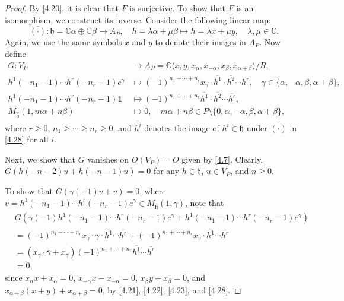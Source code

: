 \documentclass[12pt,a4paper,reqno]{amsart}
\numberwithin{equation}{section}
\numberwithin{equation}{section}
\theoremstyle{definition}
\def \C {\mathbb{C}}
\def\la{\lambda}
\def \al{\alpha}
\def \ga {\gamma}
\def \b {\beta}
\def \op {\oplus}
\def \vac {\mathbf{1}}
\def \h {\mathfrak{h}}
\def\<{\langle}
\def\>{\rangle}
\begin{document}
\begin{proof}
		By \eqref{4.20}, it is clear that $F$ is surjective. To show that $F$ is an isomorphism, we construct its inverse. Consider the following linear map:
		\begin{equation}\label{4.28}
			\bar{(\cdot)}: \h=\C\al \op \C \b\longrightarrow A_P, \quad h=\la\al+\mu \b\longmapsto \bar{h}=\la x+\mu y,\quad \la,\mu\in\C.
		\end{equation}
		Again, we use the same symbols $x$ and $y$ to denote their images in $A_P$. Now define
		\begin{equation}\label{P-Inverse}
			\begin{aligned}
				G: V_P &\longrightarrow A_P=\C\<x,y,x_\al,x_{-\al},x_\b,x_{\al+\b}\>/R,\\
				h^1(-n_1-1)\cdots h^r(-n_r-1)e^{\ga}&\longmapsto (-1)^{n_1+\cdots+n_r} x_{\ga}\cdot \overline{h^1}\cdot \overline{h^2}\cdots \overline{h^r},\quad \ga\in \{ \al,-\al,\b,\al+\b\},\\
				h^1(-n_1-1)\cdots h^r(-n_r-1)\vac&\longmapsto (-1)^{n_1+\cdots+n_r}  \overline{h^1}\cdot \overline{h^2}\cdots \overline{h^r},\\
				M_{\hat{\h}}(1,m\al+n\b)&\longmapsto 0,\quad m\al+n\b\in P\setminus\{ 0,\al,-\al, \b,\al+\b\},
			\end{aligned}
		\end{equation}
		where $r\geq 0$, $n_1\geq \cdots \geq n_r\geq 0$, and $\overline{h^i}$ denotes the image of $h^i\in \h$ under $\bar{(\cdot)}$ in \eqref{4.28} for all $i$. 
		
		Next, we show that $G$ vanishes on $O(V_P)=O$ given by \eqref{4.7}. Clearly, $G(h(-n-2)u+h(-n-1)u)=0$ for any $h\in \h$, $u\in V_P$, and $n\geq 0$.
		
		To show that $G(\ga(-1)v+v)=0$, where $v=h^1(-n_1-1)\cdots h^r(-n_r-1)e^{\ga}\in M_{\hat{\h}}(1,\ga)$, note that 
		\begin{align*}
			&G(\ga(-1)h^1(-n_1-1)\cdots h^r(-n_r-1)e^{\ga}+h^1(-n_1-1)\cdots h^r(-n_r-1)e^{\ga})\\
			&=(-1)^{n_1+\cdots +n_r}x_\ga \cdot\overline{\ga}\cdot \overline{h^1}\cdots \overline{h^r}+(-1)^{n_1+\cdots +n_r}x_\ga \cdot \overline{h^1}\cdots \overline{h^r}\\
			&=(x_\ga\cdot \overline{\ga}+x_\ga)(-1)^{n_1+\cdots +n_r}\overline{h^1}\cdots \overline{h^r}\\
			&=0,
		\end{align*} 
		since $x_\al x+x_\al=0$, $x_{-\al}x-x_{-\al}=0$, $x_\b y+x_\b=0$, and $x_{\al+\b}(x+y)+x_{\al+\b}=0$, by \eqref{4.21}, \eqref{4.22}, \eqref{4.23}, and \eqref{4.28}. 
		

\end{proof}
\end{document}
